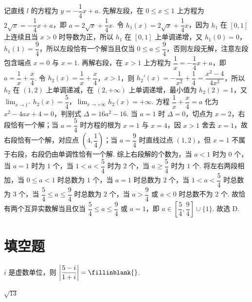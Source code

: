 \begin{solution}
记直线 \(l\) 的方程为 \(y=-\dfrac{1}{4}x+a\). 先解左段，在 \(0\le x\le 1\) 上方程为 \(2\sqrt{x}=-\dfrac{1}{4}x+a\)，即 \(a=2\sqrt{x}+\dfrac{1}{4}x\). 令 \(h_{1}\left(x\right)=2\sqrt{x}+\dfrac{1}{4}x\)，因为 \(h_{1}\) 在 \(\left[0,1\right]\) 上连续且当 \(x>0\) 时导数为正，所以 \(h_{1}\) 在 \(\left[0,1\right]\) 上单调递增，又 \(h_{1}\left(0\right)=0\)，\(h_{1}\left(1\right)=\dfrac{9}{4}\)，所以左段恰有一个解当且仅当 \(0\le a\le\dfrac{9}{4}\)，否则左段无解，注意左段包含端点 \(x=0\) 与 \(x=1\). 再解右段，在 \(x>1\) 上方程为 \(\dfrac{1}{x}=-\dfrac{1}{4}x+a\)，即 \(a=\dfrac{1}{x}+\dfrac{x}{4}\). 令 \(h_{2}\left(x\right)=\dfrac{1}{x}+\dfrac{x}{4}\)，\(x>1\)，则 \(h_{2}'\left(x\right)=-\dfrac{1}{x^{2}}+\dfrac{1}{4}=\dfrac{x^{2}-4}{4x^{2}}\)，所以 \(h_{2}\) 在 \(\left(1,2\right)\) 上单调递减，在 \(\left(2,+\infty\right)\) 上单调递增，最小值为 \(h_{2}\left(2\right)=1\)，又 \(\displaystyle\lim_{x\to 1^{+}}h_{2}\left(x\right)=\dfrac{5}{4}\)，\(\displaystyle\lim_{x\to+\infty}h_{2}\left(x\right)=+\infty\). 方程 \(\dfrac{1}{x}+\dfrac{x}{4}=a\) 化为 \(x^{2}-4ax+4=0\)，判别式 \(\Delta=16a^{2}-16\). 当 \(a=1\) 时 \(\Delta=0\)，切点为 \(x=2\)，右段恰有一个解；当 \(a=\dfrac{5}{4}\) 时方程的根为 \(x=1\) 与 \(x=4\)，因 \(x>1\) 舍去 \(x=1\)，故右段恰有一个解，对应点 \(\left(4,\dfrac{1}{4}\right)\)；当 \(a=\dfrac{9}{4}\) 时直线过点 \(\left(1,2\right)\)，但 \(x=1\) 不属于右段，右段仍由单调性恰有一个解. 综上右段解的个数为，当 \(a<1\) 时为 \(0\) 个，当 \(a=1\) 时为 \(1\) 个，当 \(1<a<\dfrac{5}{4}\) 时为 \(2\) 个，当 \(a\ge\dfrac{5}{4}\) 时为 \(1\) 个. 将左右两段相加，当 \(0\le a<1\) 时总数为 \(1\) 个，当 \(a=1\) 时总数为 \(2\) 个，当 \(1<a<\dfrac{5}{4}\) 时总数为 \(3\) 个，当 \(\dfrac{5}{4}\le a\le\dfrac{9}{4}\) 时总数为 \(2\) 个，当 \(a>\dfrac{9}{4}\) 或 \(a<0\) 时总数不为 \(2\) 个. 故恰有两个互异实数解当且仅当 \(\dfrac{5}{4}\le a\le\dfrac{9}{4}\) 或 \(a=1\)，即 \(a\in\left[\dfrac{5}{4},\dfrac{9}{4}\right]\cup\{1\}\). 故选 D.
\end{solution}
\section{填空题}

\begin{problem}
\(i\) 是虚数单位，则 \(\left|\dfrac{5-i}{1+i}\right|=\fillinblank{}\).
\end{problem}

\begin{answer}
\(\sqrt{13}\)
\end{answer}

